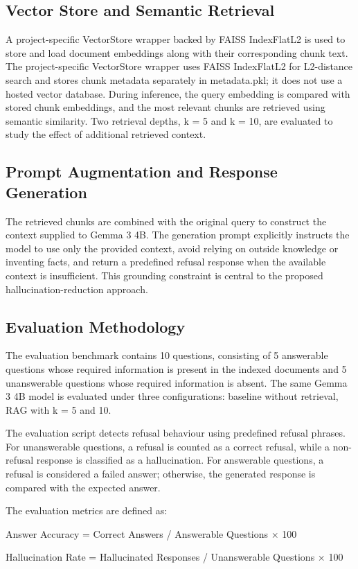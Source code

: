 \documentclass[conference]{IEEEtran}
\begin{document}
\subsection{Vector Store and Semantic Retrieval}
A project-specific VectorStore wrapper backed by FAISS IndexFlatL2 is used to store and load document embeddings along with their corresponding chunk text. The project-specific VectorStore wrapper uses FAISS IndexFlatL2 for L2-distance search and stores chunk metadata separately in metadata.pkl; it does not use a hosted vector database. During inference, the query embedding is compared with stored chunk embeddings, and the most relevant chunks are retrieved using semantic similarity. Two retrieval depths, k = 5 and k = 10, are evaluated to study the effect of additional retrieved context.
\subsection{Prompt Augmentation and Response Generation}
The retrieved chunks are combined with the original query to construct the context supplied to Gemma 3 4B. The generation prompt explicitly instructs the model to use only the provided context, avoid relying on outside knowledge or inventing facts, and return a predefined refusal response when the available context is insufficient. This grounding constraint is central to the proposed hallucination-reduction approach.
\subsection{Evaluation Methodology}
The evaluation benchmark contains 10 questions, consisting of 5 answerable questions whose required information is present in the indexed documents and 5 unanswerable questions whose required information is absent. The same Gemma 3 4B model is evaluated under three configurations: baseline without retrieval, RAG with k = 5 and 10.

The evaluation script detects refusal behaviour using predefined refusal phrases. For unanswerable questions, a refusal is counted as a correct refusal, while a non-refusal response is classified as a hallucination. For answerable questions, a refusal is considered a failed answer; otherwise, the generated response is compared with the expected answer.

The evaluation metrics are defined as:

Answer Accuracy = Correct Answers / Answerable Questions × 100

Hallucination Rate = Hallucinated Responses / Unanswerable Questions × 100
\end{document}
